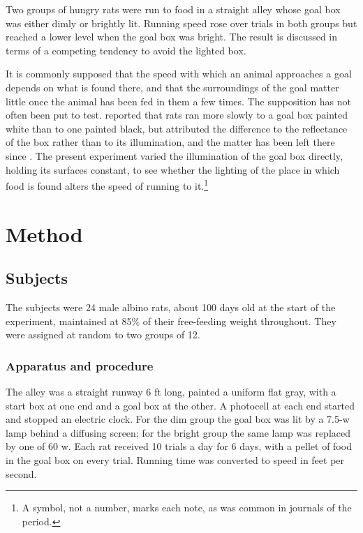\documentclass[10pt]{article}
\begin{document}
\cogramaketitle

\begin{cograsummary}
Two groups of hungry rats were run to food in a straight alley whose goal
box was either dimly or brightly lit. Running speed rose over trials in
both groups but reached a lower level when the goal box was bright. The
result is discussed in terms of a competing tendency to avoid the lighted
box.
\end{cograsummary}

It is commonly supposed that the speed with which an animal approaches a
goal depends on what is found there, and that the surroundings of the goal
matter little once the animal has been fed in them a few times. The
supposition has not often been put to test. \citet{brandt1949} reported
that rats ran more slowly to a goal box painted white than to one painted
black, but attributed the difference to the reflectance of the box rather
than to its illumination, and the matter has been left there since
\citep{halloran1953}. The present experiment varied the illumination of
the goal box directly, holding its surfaces constant, to see whether the
lighting of the place in which food is found alters the speed of running
to it.\footnote{A symbol, not a number, marks each note, as was common in
journals of the period.}

\section{Method}
\subsection{Subjects}
The subjects were 24 male albino rats, about 100 days old at the start of
the experiment, maintained at 85\% of their free-feeding weight
throughout. They were assigned at random to two groups of 12.

\subsubsection{Apparatus and procedure}
The alley was a straight runway 6 ft long, painted a uniform flat gray,
with a start box at one end and a goal box at the other. A photocell at
each end started and stopped an electric clock. For the dim group the goal
box was lit by a 7.5-w lamp behind a diffusing screen; for the bright
group the same lamp was replaced by one of 60 w. Each rat received 10
trials a day for 6 days, with a pellet of food in the goal box on every
trial. Running time was converted to speed in feet per second.
\end{document}
